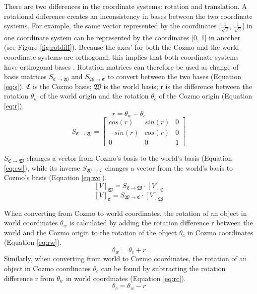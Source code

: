 \documentclass[jou,apacite]{apa6}
\begin{document}
There are two differences in the coordinate systems: rotation and translation. A rotational difference creates an inconsistency in bases between the two coordinate systems. For example, the same vector represented by the coordinates [$\frac{1}{\sqrt2}$, $\frac{1}{\sqrt2}$] in one coordinate system can be represented by the coordinates [0, 1] in another (see Figure \ref{fig:rotdiff}). Because the axes’ for both the Cozmo and the world coordinate systems are orthogonal, this implies that both coordinate systems have orthogonal bases \cite{Bretscher}
. Rotation matrices can therefore be used as change of basis matrices $S_{\mathfrak{C}\rightarrow\mathfrak{W}}$ and $S_{\mathfrak{W}\rightarrow\mathfrak{C}}$ to convert between the two bases (Equation \ref{eq:s}). $\mathfrak{C}$ is the Cozmo basis; $\mathfrak{W}$ is the world basis; r is the difference between the rotation $\theta_w$ of the world origin and the rotation $\theta_c$ of the Cozmo origin (Equation \ref{eq:r}).
\begin{equation} \label{eq:r}
r = \theta_w - \theta_c
\end{equation}
\begin{equation} \label{eq:s}
S_{\mathfrak{C}\rightarrow\mathfrak{W}}=
\begin{bmatrix}
cos(r) & sin(r) & 0 \\
-sin(r) & cos(r) & 0 \\
0 & 0 & 1
\end{bmatrix}
\end{equation}

$S_{\mathfrak{C}\rightarrow\mathfrak{W}}$ changes a vector from Cozmo's basis to the world's basis (Equation \ref{eq:cw}), while its inverse $S_{\mathfrak{W}\rightarrow\mathfrak{C}}$ changes a vector from the world's basis to Cozmo's basis (Equation \ref{eq:wc}).
\begin{equation} \label{eq:cw}
[V]_\mathfrak{W} = S_{\mathfrak{C}\rightarrow\mathfrak{W}} \cdot [V]_\mathfrak{C}
\end{equation}
\begin{equation} \label{eq:wc}
[V]_\mathfrak{C} = S_{\mathfrak{W}\rightarrow\mathfrak{C}} \cdot [V]_\mathfrak{W}
\end{equation}

When converting from Cozmo to world coordinates, the rotation of an object in world coordinates $\theta_w$ is calculated by adding the rotation difference r between the world and the Cozmo origin to the rotation of the object $\theta_c$ in Cozmo coordinates (Equation \ref{eq:rw}).
\begin{equation} \label{eq:rw}
	\theta_w = \theta_c + r
\end{equation}
Similarly, when converting from world to Cozmo coordinates, the rotation of an object in Cozmo coordinates $\theta_c$ can be found by subtracting the rotation difference r from $\theta_w$ in world coordinates (Equation \ref{eq:rc}).
\begin{equation} \label{eq:rc}
	\theta_c = \theta_w - r
\end{equation}
\end{document}
